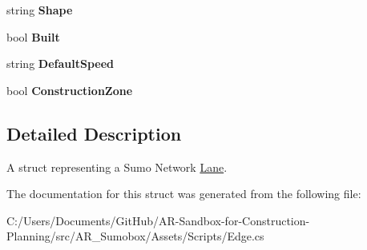 \begin{DoxyCompactItemize}
\item 
\mbox{\label{struct_lane_aa0ac1e2360a777f4396a71b9199937a6}} 
string {\bfseries Shape}
\item 
\mbox{\label{struct_lane_ac0c12c537a72f4ffd85b452492afa5f6}} 
bool {\bfseries Built}
\item 
\mbox{\label{struct_lane_a9519e9d145f9b4cd70c94a9b91339f0b}} 
string {\bfseries Default\+Speed}
\item 
\mbox{\label{struct_lane_a7c8bc75b78dbedae08f88aa78f1205a3}} 
bool {\bfseries Construction\+Zone}
\end{DoxyCompactItemize}


\subsection{Detailed Description}
A struct representing a Sumo Network \mbox{\hyperlink{struct_lane}{Lane}}. 



The documentation for this struct was generated from the following file\+:\begin{DoxyCompactItemize}
\item 
C\+:/\+Users/\+Documents/\+Git\+Hub/\+A\+R-\/\+Sandbox-\/for-\/\+Construction-\/\+Planning/src/\+A\+R\+\_\+\+Sumobox/\+Assets/\+Scripts/Edge.\+cs\end{DoxyCompactItemize}

